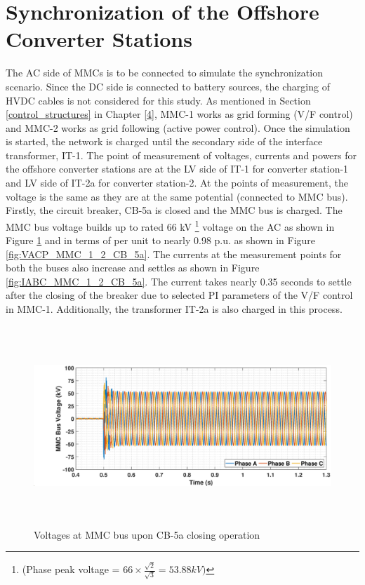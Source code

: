 \section{Synchronization of the Offshore Converter Stations}
The \gls{AC} side of \gls{MMC}s is to be connected to simulate the synchronization scenario. Since the \gls{DC} side is connected to battery sources, the charging of \gls{HVDC} cables is not considered for this study. As mentioned in Section \ref{control_structures} in Chapter \ref{4}, \gls{MMC}-1 works as grid forming (V/F control) and \gls{MMC}-2 works as grid following (active power control). Once the simulation is started, the network is charged until the secondary side of the interface transformer, IT-1. The point of measurement of voltages, currents and powers for the offshore converter stations are at the \gls{LV} side of IT-1 for converter station-1 and \gls{LV} side of IT-2a for converter station-2. At the points of measurement, the voltage is the same as they are at the same potential (connected to \gls{MMC} bus). Firstly, the circuit breaker, CB-5a is closed and the \gls{MMC} bus is charged. The \gls{MMC} bus voltage builds up to rated 66 kV \footnote{(Phase peak voltage = $66\times \frac{\sqrt{2}}{\sqrt{3}} = 53.88 kV)$} voltage on the \gls{AC} as shown in Figure \ref{fig:VABC_MMC_1_2_CB_5a} and in terms of per unit to nearly 0.98 p.u. as shown in Figure \ref{fig:VACP_MMC_1_2_CB_5a}. The currents at the measurement points for both the buses also increase and settles as shown in Figure \ref{fig:IABC_MMC_1_2_CB_5a}. The current takes nearly 0.35 seconds to settle after the closing of the breaker due to selected \gls{PI} parameters of the V/F control in \gls{MMC}-1. Additionally, the transformer IT-2a is also charged in this process. 

\begin{figure}[H]
    \includegraphics[height = 7.5cm,width = \textwidth]{Diagrams/Chapter_5/VABC_MMC_1_2_CB_5a.eps}
    \caption{Voltages at MMC bus upon CB-5a closing operation}
    \label{fig:VABC_MMC_1_2_CB_5a}
\end{figure}

